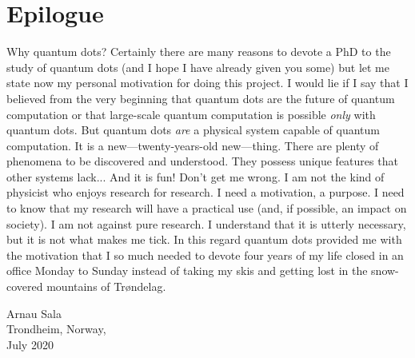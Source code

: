 
\chapter*{Epilogue\label{sec:epi}}

Why quantum dots? Certainly there are many reasons to devote a PhD to the study of quantum dots (and I hope I have already given you some) but let me state now my personal motivation for doing this project.
I would lie if I say that I believed from the very beginning that quantum dots are the future of quantum computation or that large-scale quantum computation is possible \textit{only} with quantum dots. But quantum dots \textit{are} a physical system capable of quantum computation. It is a new---twenty-years-old new---thing. There are plenty of phenomena to be discovered and understood. They possess unique features that other systems lack... And it is fun!
Don't get me wrong. I am not the kind of physicist who enjoys research for research. I need a motivation, a purpose. I need to know that my research will have a practical use (and, if possible, an impact on society). I am not against pure research. I understand that it is utterly necessary, but it is not what makes me tick. In this regard quantum dots provided me with the motivation that I so much needed to devote four years of my life closed in an office Monday to Sunday instead of taking my skis and getting lost in the snow-covered mountains of Tr{\o}ndelag.

\vspace{1cm}
\begin{flushright}
Arnau Sala\\
Trondheim, Norway,\\
July 2020
\end{flushright}



